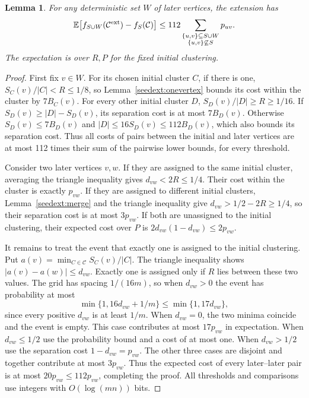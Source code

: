 \documentclass[11pt]{article}
\newtheorem{lemma}[theorem]{Lemma}
\begin{document}
\begin{lemma}
\label{seedext:additional}
For any deterministic set $W$ of later vertices, the extension has
\[
 \mathbb E\bigl[f_{S\cup W}(\mathcal C^{\rm ext})
                    -f_S(\mathcal C)\bigr]
 \le112\sum_{\substack{\{u,v\}\subseteq S\cup W\\
                        \{u,v\}\not\subseteq S}}p_{uv}.
\]
The expectation is over $R,P$ for the fixed initial clustering.
\end{lemma}
\begin{proof}
First fix $v\in W$. For its chosen initial cluster $C$, if there is one,
$S_C(v)/|C|<R\le1/8$, so Lemma~\ref{seedext:onevertex} bounds its
cost within the cluster by $7B_C(v)$. For every other initial cluster $D$,
$S_D(v)/|D|\ge R\ge1/16$. If
$S_D(v)\ge |D|-S_D(v)$, its separation cost is at most $7B_D(v)$.
Otherwise $S_D(v)\le7B_D(v)$ and
$|D|\le16S_D(v)\le112B_D(v)$, which also bounds its separation cost.
Thus all costs of pairs between the initial and later vertices are at most 112 times their
sum of the pairwise lower bounds,
for every threshold.

Consider two later vertices $v,w$. If they are assigned to the same initial cluster,
averaging the triangle inequality gives $d_{vw}<2R\le1/4$. Their
cost within the cluster is exactly $p_{vw}$. If they are assigned to different initial clusters,
Lemma~\ref{seedext:merge} and the triangle inequality give
$d_{vw}>1/2-2R\ge1/4$, so their separation cost is at most $3p_{vw}$.
If both are unassigned to the initial clustering, their expected cost over $P$ is
$2d_{vw}(1-d_{vw})\le2p_{vw}$.

It remains to treat the event that exactly one is assigned to the initial clustering.
Put $a(v)=\min_{C\in\mathcal C}S_C(v)/|C|$. The triangle inequality
shows $|a(v)-a(w)|\le d_{vw}$. Exactly one is assigned only if $R$
lies between these two values. The grid has spacing $1/(16m)$,
so when $d_{vw}>0$ the event has probability at most
\[
 \min\{1,16d_{vw}+1/m\}\le\min\{1,17d_{vw}\},
\]
since every positive $d_{vw}$ is at least $1/m$. When $d_{vw}=0$,
the two minima coincide and the event is empty. This case contributes at most $17p_{vw}$ in expectation. When
$d_{vw}\le1/2$ use the probability bound and a cost of at most one.
When $d_{vw}>1/2$ use the separation cost $1-d_{vw}=p_{vw}$. The
other three cases are disjoint and together contribute at most $3p_{vw}$.
Thus the expected cost of every later--later pair is at most
$20p_{vw}\le112p_{vw}$, completing the proof. All thresholds and
comparisons use integers with $O(\log(mn))$ bits.
\end{proof}
\end{document}
